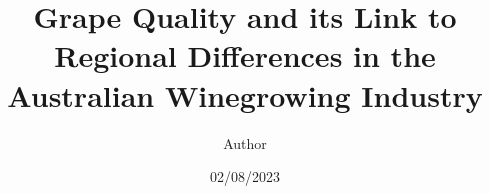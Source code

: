 \documentclass[review,12pt,authoryear]{elsarticle}
\begin{document}
\begin{linenumbers}
\begin{frontmatter}




\title{Grape Quality and its Link to Regional Differences in the Australian Winegrowing Industry}


\author[label1,label2,label3]{Author}
\date{02/08/2023}

\begin{abstract}
\end{abstract}


\end{frontmatter}
\end{linenumbers}
\end{document}
